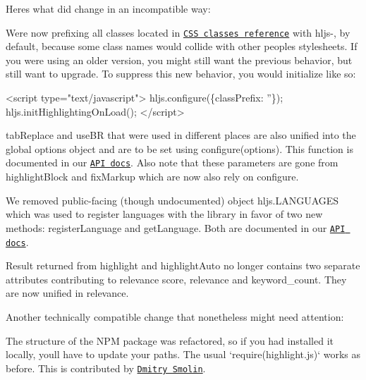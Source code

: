 Here\textquotesingle{}s what did change in an incompatible way\+:


\begin{DoxyItemize}
\item We\textquotesingle{}re now prefixing all classes located in \href{http://highlightjs.readthedocs.org/en/latest/css-classes-reference.html}{\tt C\+SS classes reference} with {\ttfamily hljs-\/}, by default, because some class names would collide with other people\textquotesingle{}s stylesheets. If you were using an older version, you might still want the previous behavior, but still want to upgrade. To suppress this new behavior, you would initialize like so\+:
\end{DoxyItemize}


\begin{DoxyCode}
<script type="text/javascript">
  hljs.configure(\{classPrefix: ''\});
  hljs.initHighlightingOnLoad();
</script>
\end{DoxyCode}



\begin{DoxyItemize}
\item {\ttfamily tab\+Replace} and {\ttfamily use\+BR} that were used in different places are also unified into the global options object and are to be set using {\ttfamily configure(options)}. This function is documented in our \href{http://highlightjs.readthedocs.org/en/latest/api.html}{\tt A\+PI docs}. Also note that these parameters are gone from {\ttfamily highlight\+Block} and {\ttfamily fix\+Markup} which are now also rely on {\ttfamily configure}.
\item We removed public-\/facing (though undocumented) object {\ttfamily hljs.\+L\+A\+N\+G\+U\+A\+G\+ES} which was used to register languages with the library in favor of two new methods\+: {\ttfamily register\+Language} and {\ttfamily get\+Language}. Both are documented in our \href{http://highlightjs.readthedocs.org/en/latest/api.html}{\tt A\+PI docs}.
\item Result returned from {\ttfamily highlight} and {\ttfamily highlight\+Auto} no longer contains two separate attributes contributing to relevance score, {\ttfamily relevance} and {\ttfamily keyword\+\_\+count}. They are now unified in {\ttfamily relevance}.
\end{DoxyItemize}

Another technically compatible change that nonetheless might need attention\+:


\begin{DoxyItemize}
\item The structure of the N\+PM package was refactored, so if you had installed it locally, you\textquotesingle{}ll have to update your paths. The usual `require(\textquotesingle{}highlight.\+js\textquotesingle{})` works as before. This is contributed by \href{https://github.com/dimsmol}{\tt Dmitry Smolin}.
\end{DoxyItemize}

